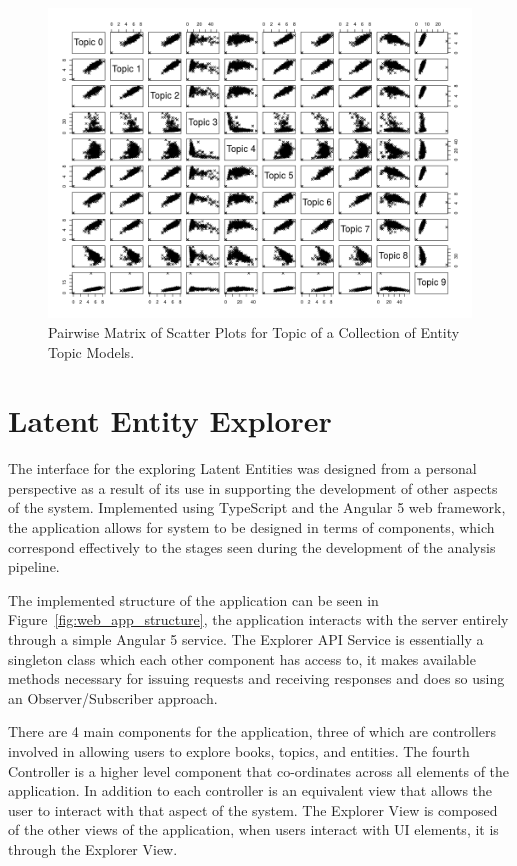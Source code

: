 \documentclass[10pt]{report}
\begin{document}
\begin{figure}[h!]
  \centering
  \includegraphics[scale=0.55]{entity_topic_models}
  \caption{Pairwise Matrix of Scatter Plots for Topic of a Collection of Entity Topic Models.\label{fig:etm_plot}}
\end{figure}

\section{Latent Entity Explorer}
The interface for the exploring Latent Entities was designed from a personal perspective as a result of its use in supporting the development of other aspects of the system. Implemented using TypeScript and the Angular 5 web framework, the application allows for system to be designed in terms of components, which correspond effectively to the stages seen during the development of the analysis pipeline.

The implemented structure of the application can be seen in Figure~\ref{fig:web_app_structure}, the application interacts with the server entirely through a simple Angular 5 service. The Explorer API Service is essentially a singleton class which each other component has access to, it makes available methods necessary for issuing requests and receiving responses and does so using an Observer/Subscriber approach. 

There are 4 main components for the application, three of which are controllers involved in allowing users to explore books, topics, and entities. The fourth Controller is a higher level component that co-ordinates across all elements of the application. In addition to each controller is an equivalent view that allows the user to interact with that aspect of the system. The Explorer View is composed of the other views of the application, when users interact with UI elements, it is through the Explorer View.
\end{document}
